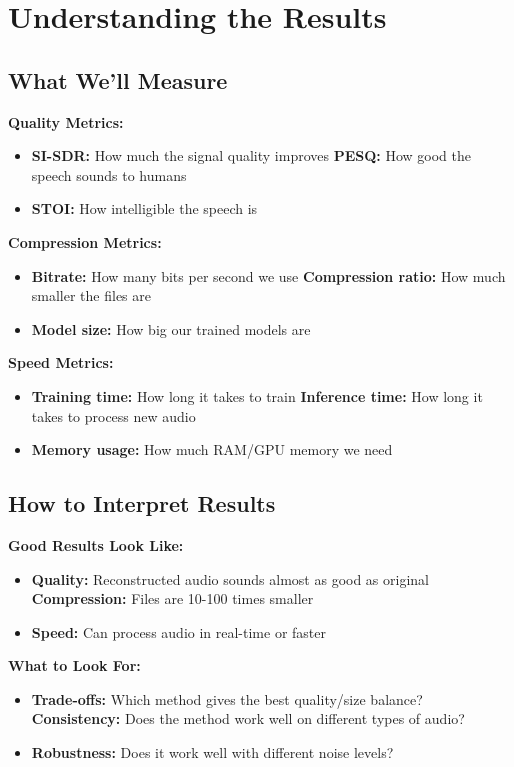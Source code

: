 \documentclass[12pt]{article}
\begin{document}
\section{Understanding the Results}

\subsection{What We'll Measure}

\textbf{Quality Metrics:}
\begin{itemize}
    \item \textbf{SI-SDR:} How much the signal quality improves
    \textbf{PESQ:} How good the speech sounds to humans
    \item \textbf{STOI:} How intelligible the speech is
\end{itemize}

\textbf{Compression Metrics:}
\begin{itemize}
    \item \textbf{Bitrate:} How many bits per second we use
    \textbf{Compression ratio:} How much smaller the files are
    \item \textbf{Model size:} How big our trained models are
\end{itemize}

\textbf{Speed Metrics:}
\begin{itemize}
    \item \textbf{Training time:} How long it takes to train
    \textbf{Inference time:} How long it takes to process new audio
    \item \textbf{Memory usage:} How much RAM/GPU memory we need
\end{itemize}

\subsection{How to Interpret Results}

\textbf{Good Results Look Like:}
\begin{itemize}
    \item \textbf{Quality:} Reconstructed audio sounds almost as good as original
    \textbf{Compression:} Files are 10-100 times smaller
    \item \textbf{Speed:} Can process audio in real-time or faster
\end{itemize}

\textbf{What to Look For:}
\begin{itemize}
    \item \textbf{Trade-offs:} Which method gives the best quality/size balance?
    \textbf{Consistency:} Does the method work well on different types of audio?
    \item \textbf{Robustness:} Does it work well with different noise levels?
\end{itemize}
\end{document}
